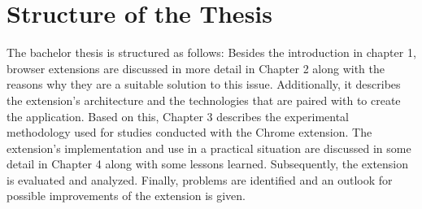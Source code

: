 \section{Structure of the Thesis}
The bachelor thesis is structured as follows: Besides the introduction in chapter 1, browser extensions are discussed in more detail in Chapter 2 along with the reasons why they are a suitable solution to this issue. Additionally, it describes the extension's architecture and the technologies that are paired with to create the application. Based on this, Chapter 3 describes the experimental methodology used for studies conducted with the Chrome extension. The extension's implementation and use in a practical situation are discussed in some detail in Chapter 4 along with some lessons learned. Subsequently, the extension is evaluated and analyzed. Finally, problems are identified and an outlook for possible improvements of the extension is given.
